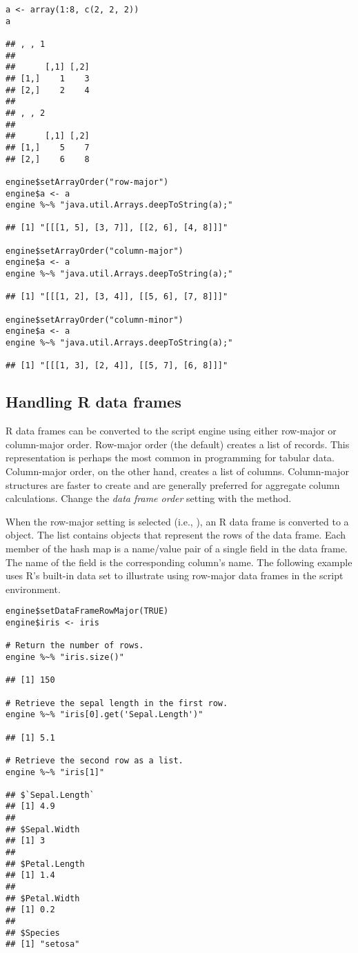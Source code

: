 \begin{verbatim}
a <- array(1:8, c(2, 2, 2))
a

## , , 1
##
##      [,1] [,2]
## [1,]    1    3
## [2,]    2    4
##
## , , 2
##
##      [,1] [,2]
## [1,]    5    7
## [2,]    6    8

engine$setArrayOrder("row-major")
engine$a <- a
engine %~% "java.util.Arrays.deepToString(a);"

## [1] "[[[1, 5], [3, 7]], [[2, 6], [4, 8]]]"

engine$setArrayOrder("column-major")
engine$a <- a
engine %~% "java.util.Arrays.deepToString(a);"

## [1] "[[[1, 2], [3, 4]], [[5, 6], [7, 8]]]"

engine$setArrayOrder("column-minor")
engine$a <- a
engine %~% "java.util.Arrays.deepToString(a);"

## [1] "[[[1, 3], [2, 4]], [[5, 7], [6, 8]]]"
\end{verbatim}

\hypertarget{handlingrdataframes}{\subsection{Handling R data frames}}

R data frames can be converted to the script engine using either row-major or column-major order. Row-major order (the default) creates a list of records. This representation is perhaps the most common in programming for tabular data. Column-major order, on the other hand, creates a list of columns. Column-major structures are faster to create and are generally preferred for aggregate column calculations. Change the \textit{data frame order} setting with the  method.

When the row-major setting is selected (i.e., ), an R data frame is converted to a \href{https://docs.oracle.com/javase/8/docs/api/java/util/ArrayList.html}{} object. The list contains  \href{https://docs.oracle.com/javase/8/docs/api/java/util/LinkedHashMap.html}{} objects that represent the rows of the data frame. Each member of the hash map is a name/value pair of a single field in the data frame. The name of the field is the corresponding column's name. The following example uses R's built-in  data set to illustrate using row-major data frames in the script environment.

\begin{verbatim}
engine$setDataFrameRowMajor(TRUE)
engine$iris <- iris

# Return the number of rows.
engine %~% "iris.size()"

## [1] 150

# Retrieve the sepal length in the first row.
engine %~% "iris[0].get('Sepal.Length')"

## [1] 5.1

# Retrieve the second row as a list.
engine %~% "iris[1]"

## $`Sepal.Length`
## [1] 4.9
##
## $Sepal.Width
## [1] 3
##
## $Petal.Length
## [1] 1.4
##
## $Petal.Width
## [1] 0.2
##
## $Species
## [1] "setosa"
\end{verbatim}

